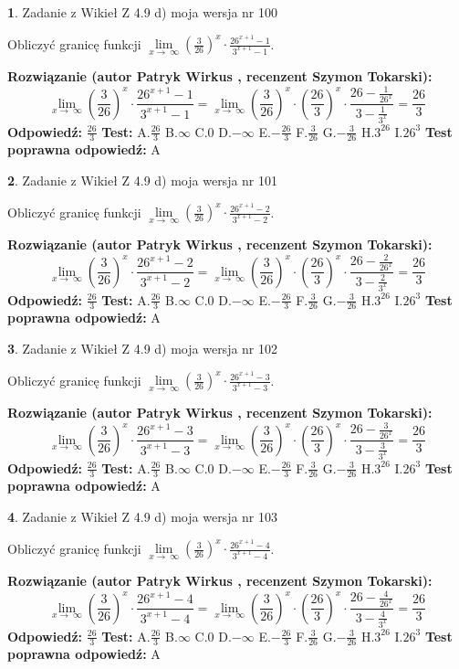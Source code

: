 \documentclass[12pt, a4paper]{article}
\theoremstyle{definition} %
\newtheorem{zad}{}
\newcommand{\zadStart}[1]{\begin{zad}#1\newline}
\newcommand{\zadStop}{\end{zad}}
\newcommand{\rozwStart}[2]{\noindent \textbf{Rozwiązanie (autor #1 , recenzent #2): }\newline}
\newcommand{\rozwStop}{\newline}
\newcommand{\odpStart}{\noindent \textbf{Odpowiedź:}\newline}
\newcommand{\odpStop}{\newline}
\newcommand{\testStart}{\noindent \textbf{Test:}\newline}
\newcommand{\testStop}{\newline}
\newcommand{\kluczStart}{\noindent \textbf{Test poprawna odpowiedź:}\newline}
\newcommand{\kluczStop}{\newline}
\begin{document}
\zadStart{Zadanie z Wikieł Z 4.9 d) moja wersja nr 100}


Obliczyć granicę funkcji  $\lim\limits_{x\to\ \infty}(\frac{3}{26})^{x}\cdot\frac{26^{x+1}-1}{3^{x+1}-1}$.
\zadStop
\rozwStart{Patryk Wirkus}{Szymon Tokarski}
$$\lim\limits_{x\to\ \infty}(\frac{3}{26})^{x}\cdot\frac{26^{x+1}-1}{3^{x+1}-1}=\lim\limits_{x\to\ \infty}(\frac{3}{26})^{x}\cdot(\frac{26}{3})^{x} \cdot \frac{26-\frac{1}{26^{x}}}{3-\frac{1}{3^{x}}} = \frac{26}{3}$$
\rozwStop
\odpStart
$\frac{26}{3}$
\odpStop
\testStart
A.$\frac{26}{3}$ B.$\infty$ C.$0$ D.$-\infty$ E.$-\frac{26}{3}$
F.$\frac{3}{26}$ G.$-\frac{3}{26}$
H.$3^{26}$
I.$26^{3}$
\testStop
\kluczStart
A
\kluczStop



\zadStart{Zadanie z Wikieł Z 4.9 d) moja wersja nr 101}


Obliczyć granicę funkcji  $\lim\limits_{x\to\ \infty}(\frac{3}{26})^{x}\cdot\frac{26^{x+1}-2}{3^{x+1}-2}$.
\zadStop
\rozwStart{Patryk Wirkus}{Szymon Tokarski}
$$\lim\limits_{x\to\ \infty}(\frac{3}{26})^{x}\cdot\frac{26^{x+1}-2}{3^{x+1}-2}=\lim\limits_{x\to\ \infty}(\frac{3}{26})^{x}\cdot(\frac{26}{3})^{x} \cdot \frac{26-\frac{2}{26^{x}}}{3-\frac{2}{3^{x}}} = \frac{26}{3}$$
\rozwStop
\odpStart
$\frac{26}{3}$
\odpStop
\testStart
A.$\frac{26}{3}$ B.$\infty$ C.$0$ D.$-\infty$ E.$-\frac{26}{3}$
F.$\frac{3}{26}$ G.$-\frac{3}{26}$
H.$3^{26}$
I.$26^{3}$
\testStop
\kluczStart
A
\kluczStop



\zadStart{Zadanie z Wikieł Z 4.9 d) moja wersja nr 102}


Obliczyć granicę funkcji  $\lim\limits_{x\to\ \infty}(\frac{3}{26})^{x}\cdot\frac{26^{x+1}-3}{3^{x+1}-3}$.
\zadStop
\rozwStart{Patryk Wirkus}{Szymon Tokarski}
$$\lim\limits_{x\to\ \infty}(\frac{3}{26})^{x}\cdot\frac{26^{x+1}-3}{3^{x+1}-3}=\lim\limits_{x\to\ \infty}(\frac{3}{26})^{x}\cdot(\frac{26}{3})^{x} \cdot \frac{26-\frac{3}{26^{x}}}{3-\frac{3}{3^{x}}} = \frac{26}{3}$$
\rozwStop
\odpStart
$\frac{26}{3}$
\odpStop
\testStart
A.$\frac{26}{3}$ B.$\infty$ C.$0$ D.$-\infty$ E.$-\frac{26}{3}$
F.$\frac{3}{26}$ G.$-\frac{3}{26}$
H.$3^{26}$
I.$26^{3}$
\testStop
\kluczStart
A
\kluczStop



\zadStart{Zadanie z Wikieł Z 4.9 d) moja wersja nr 103}


Obliczyć granicę funkcji  $\lim\limits_{x\to\ \infty}(\frac{3}{26})^{x}\cdot\frac{26^{x+1}-4}{3^{x+1}-4}$.
\zadStop
\rozwStart{Patryk Wirkus}{Szymon Tokarski}
$$\lim\limits_{x\to\ \infty}(\frac{3}{26})^{x}\cdot\frac{26^{x+1}-4}{3^{x+1}-4}=\lim\limits_{x\to\ \infty}(\frac{3}{26})^{x}\cdot(\frac{26}{3})^{x} \cdot \frac{26-\frac{4}{26^{x}}}{3-\frac{4}{3^{x}}} = \frac{26}{3}$$
\rozwStop
\odpStart
$\frac{26}{3}$
\odpStop
\testStart
A.$\frac{26}{3}$ B.$\infty$ C.$0$ D.$-\infty$ E.$-\frac{26}{3}$
F.$\frac{3}{26}$ G.$-\frac{3}{26}$
H.$3^{26}$
I.$26^{3}$
\testStop
\kluczStart
A
\kluczStop
\end{document}

